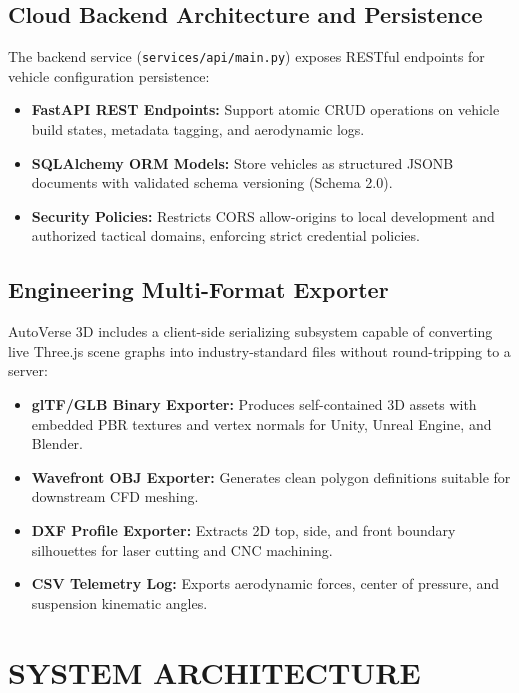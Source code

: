 \documentclass[12pt,a4paper]{report}
\begin{document}
\section{Cloud Backend Architecture and Persistence}
The backend service (\texttt{services/api/main.py}) exposes RESTful endpoints for vehicle configuration persistence:
\begin{itemize}
    \item \textbf{FastAPI REST Endpoints:} Support atomic CRUD operations on vehicle build states, metadata tagging, and aerodynamic logs.
    \item \textbf{SQLAlchemy ORM Models:} Store vehicles as structured JSONB documents with validated schema versioning (Schema 2.0).
    \item \textbf{Security Policies:} Restricts CORS allow-origins to local development and authorized tactical domains, enforcing strict credential policies.
\end{itemize}

\section{Engineering Multi-Format Exporter}
AutoVerse 3D includes a client-side serializing subsystem capable of converting live Three.js scene graphs into industry-standard files without round-tripping to a server:
\begin{itemize}
    \item \textbf{glTF/GLB Binary Exporter:} Produces self-contained 3D assets with embedded PBR textures and vertex normals for Unity, Unreal Engine, and Blender.
    \item \textbf{Wavefront OBJ Exporter:} Generates clean polygon definitions suitable for downstream CFD meshing.
    \item \textbf{DXF Profile Exporter:} Extracts 2D top, side, and front boundary silhouettes for laser cutting and CNC machining.
    \item \textbf{CSV Telemetry Log:} Exports aerodynamic forces, center of pressure, and suspension kinematic angles.
\end{itemize}

\chapter{SYSTEM ARCHITECTURE}
\end{document}
